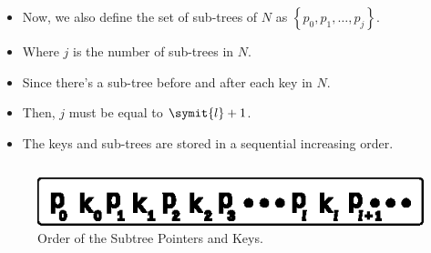 \documentclass{beamer}
\begin{document}
\begin{frame}
    \begin{columns}
        \begin{column}{\textlecolumn}
            \begin{block}{}
                \begin{itemize}
                    \item Now, we also define the set of sub-trees of \(N\) as \(\left\{p_0, p_1, \ldots{}, p_j\right\}\).
                    \item Where \(j\) is the number of sub-trees in \(N\).
                    \item Since there's a sub-tree before and after each key in \(N\).
                    \item Then, \(j\) must be equal to \(\symit{l} + 1\).
                    \item The keys and sub-trees are stored in a sequential increasing order.
                \end{itemize}
            \end{block}
        \end{column}
        \begin{column}{\textricolumn}
        \end{column}
    \end{columns}
    \begin{figure}[h!]
        \includegraphics[width=0.85\linewidth]{resources/made/key_subtree_order.eps}
        \caption{Order of the Subtree Pointers and Keys.}
    \end{figure}

    \framebreak


\end{frame}
\end{document}
